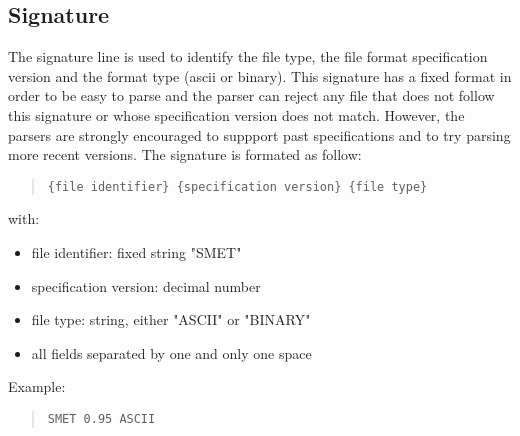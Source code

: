\documentclass[a4paper,10pt]{article}
\begin{document}
\subsection{Signature}
The signature line is used to identify the file type, the file format specification version and the format type (ascii or binary). This signature has a fixed format in order to be easy to parse and the parser can reject any file that does not follow this signature or whose specification version does not match. However, the parsers are strongly encouraged to suppport past specifications and to try parsing more recent versions. The signature is formated as follow:
\begin{quote} \begin{verbatim}
{file identifier} {specification version} {file type}
\end{verbatim}\end{quote} 
with:
\begin{itemize}
	\item file identifier: fixed string "SMET"
	\item specification version: decimal number
	\item file type: string, either "ASCII" or "BINARY"
	\item all fields separated by one and only one space
\end{itemize}
Example:
\begin{quote} \begin{verbatim}
SMET 0.95 ASCII
\end{verbatim}\end{quote} 
\end{document}
